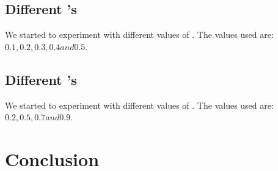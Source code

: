 \documentclass{article}
\begin{document}
\subsection{Different \alpha's}
We started to experiment with different values of \alpha. The values used are:
$0.1 , 0.2, 0.3, 0.4 and 0.5$. 

\subsection{Different \gamma's}
We started to experiment with different values of \gamma. The values used are:
$0.2, 0.5, 0.7 and 0.9$. 



\section{Conclusion}
\end{document}
